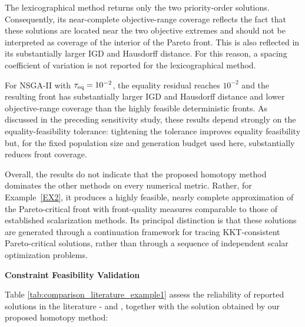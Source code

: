 \documentclass[11pt,pdflatex,sn-mathphys-ay]{sn-jnl}%
\theoremstyle{definition}
\theoremstyle{thmstyleone}%
\theoremstyle{thmstyletwo}%
\theoremstyle{thmstylethree}%
\newcommand{\add}[1]{\textcolor{revisionblue}{#1}}
\begin{document}
	\add{The lexicographical method returns only the two priority-order solutions.
		Consequently, its near-complete objective-range coverage reflects the fact
		that these solutions are located near the two objective extremes and
		should not be interpreted as coverage of the interior of the Pareto
		front. This is also reflected in its substantially larger IGD and
		Hausdorff distance. For this reason, a spacing coefficient of variation is
		not reported for the lexicographical method.}
	
	\add{For NSGA-II with $\tau_{\rm eq}=10^{-2}$, the equality residual reaches
		$10^{-2}$ and the resulting front has substantially larger IGD and
		Hausdorff distance and lower objective-range coverage than the highly
		feasible deterministic fronts. As discussed in the preceding sensitivity
		study, these results depend strongly on the equality-feasibility
		tolerance: tightening the tolerance improves equality feasibility but,
		for the fixed population size and generation budget used here,
		substantially reduces front coverage.}
	
	\add{Overall, the results do not indicate that the proposed homotopy method
		dominates the other methods on every numerical metric. Rather, for
		Example~\ref{EX2}, it produces a highly feasible, nearly complete
		approximation of the Pareto-critical front with front-quality measures
		comparable to those of established scalarization methods. Its principal
		distinction is that these solutions are generated through a continuation
		framework for tracing KKT-consistent Pareto-critical solutions, rather
		than through a sequence of independent scalar optimization problems.}
	
	
	\medskip\noindent \textbf{Constraint Feasibility Validation}
	
	Table \ref{tab:comparison_literature_example1} 
	assess the reliability of reported solutions in the literature - \cite{shang2011} and  
	\cite{zhao2012quasinormal}, together with the solution obtained by our proposed homotopy method: 
	
\end{document}
